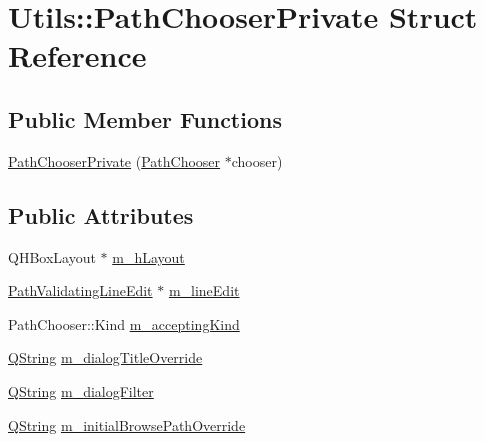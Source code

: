 \hypertarget{struct_utils_1_1_path_chooser_private}{\section{\-Utils\-:\-:\-Path\-Chooser\-Private \-Struct \-Reference}
\label{struct_utils_1_1_path_chooser_private}
}
\subsection*{\-Public \-Member \-Functions}
\begin{DoxyCompactItemize}
\item 
\hyperlink{struct_utils_1_1_path_chooser_private_a1f39942cdf20577592d0bfdf6b85414c}{\-Path\-Chooser\-Private} (\hyperlink{class_utils_1_1_path_chooser}{\-Path\-Chooser} $\ast$chooser)
\end{DoxyCompactItemize}
\subsection*{\-Public \-Attributes}
\begin{DoxyCompactItemize}
\item 
\-Q\-H\-Box\-Layout $\ast$ \hyperlink{struct_utils_1_1_path_chooser_private_a774f99b0dc2901501561d86a347c1966}{m\-\_\-h\-Layout}
\item 
\hyperlink{class_utils_1_1_path_validating_line_edit}{\-Path\-Validating\-Line\-Edit} $\ast$ \hyperlink{struct_utils_1_1_path_chooser_private_ae5140b32894490e7013b4f9f8ee18afc}{m\-\_\-line\-Edit}
\item 
\-Path\-Chooser\-::\-Kind \hyperlink{struct_utils_1_1_path_chooser_private_a11637562bcf59fc369d6e65b4f01cb77}{m\-\_\-accepting\-Kind}
\item 
\hyperlink{group___u_a_v_objects_plugin_gab9d252f49c333c94a72f97ce3105a32d}{\-Q\-String} \hyperlink{struct_utils_1_1_path_chooser_private_a5a95de28d99841640ca55678d9795a62}{m\-\_\-dialog\-Title\-Override}
\item 
\hyperlink{group___u_a_v_objects_plugin_gab9d252f49c333c94a72f97ce3105a32d}{\-Q\-String} \hyperlink{struct_utils_1_1_path_chooser_private_aa4d089b9547a21ea1d39c8c8151b82d9}{m\-\_\-dialog\-Filter}
\item 
\hyperlink{group___u_a_v_objects_plugin_gab9d252f49c333c94a72f97ce3105a32d}{\-Q\-String} \hyperlink{struct_utils_1_1_path_chooser_private_a4f55a8d0bc8cc0199a158f632e6f053a}{m\-\_\-initial\-Browse\-Path\-Override}
\end{DoxyCompactItemize}


